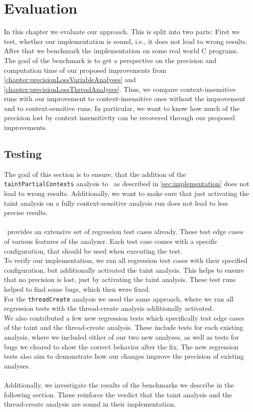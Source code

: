 
\chapter{Evaluation}\label{chapter:evaluation}
  In this chapter we evaluate our approach. This is split into two parts: First we test, whether our implementation is sound, i.e., it does not lead to wrong results. After that we benchmark the implementation on some real world C programs. The goal of the benchmark is to get a perspective on the precision and computation time of our proposed improvements from \autoref{chapter:precisionLossVariableAnalyses} and \autoref{chapter:precisionLossThreadAnalyses}. Thus, we compare context-insensitive runs with our improvement to context-insensitive ones without the improvement and to context-sensitive runs. In particular, we want to know how much of the precision lost by context insensitivity can be recovered through our proposed improvements.

  \section{Testing}
    The goal of this section is to ensure, that the addition of the \texttt{taintPartialContexts} analysis to \gob\ as described in \autoref{sec:implementation} does not lead to wrong results. Additionally, we want to make sure that just activating the taint analysis on a fully context-sensitive analysis run does not lead to less precise results.\\
    \\
    \gob\ provides an extensive set of regression test cases already. These test edge cases of various features of the analyzer. Each test case comes with a specific configuration, that should be used when executing the test.\\
    To verify our implementation, we ran all regression test cases with their specified configuration, but additionally activated the taint analysis. This helps to ensure that no precision is lost, just by activating the taint analysis. These test runs helped to find some bugs, which then were fixed.\\
    For the \texttt{threadCreate} analysis we used the same approach, where we ran all regression tests with the thread-create analysis additionally activated.\\
    We also contributed a few new regression tests which specifically test edge cases of the taint and the thread-create analysis. These include tests for each existing analysis, where we included either of our two new analyses, as well as tests for bugs we cleared to show the correct behavior after the fix. The new regression tests also aim to demonstrate how our changes improve the precision of existing analyses.\\
    \\
    Additionally, we investigate the results of the benchmarks we describe in the following section. These reinforce the verdict that the taint analysis and the thread-create analysis are sound in their implementation.
  
